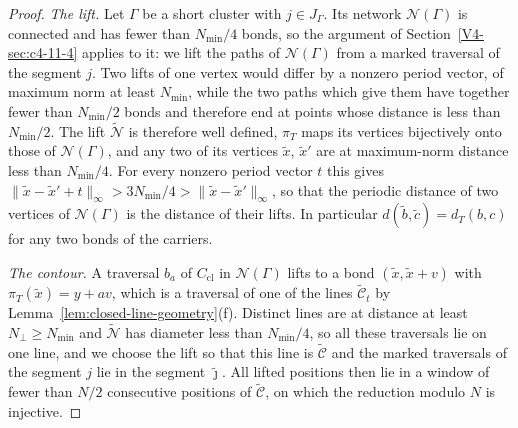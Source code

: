\documentclass[11pt]{article}
\numberwithin{equation}{section}
\theoremstyle{remark}
\theoremstyle{plain}
\begin{document}
\begin{proof}
\emph{The lift.} Let $\Gamma$ be a short cluster with $j\in J_{\Gamma}$. Its network $\mathscr N(\Gamma)$ is connected and has fewer than $N_{\min}/4$ bonds, so the argument of Section~\ref{V4-sec:c4-11-4} applies to it: we lift the paths of $\mathscr N(\Gamma)$ from a marked traversal of the segment $j$. Two lifts of one vertex would differ by a nonzero period vector, of maximum norm at least $N_{\min}$, while the two paths which give them have together fewer than $N_{\min}/2$ bonds and therefore end at points whose distance is less than $N_{\min}/2$. The lift $\widetilde{\mathscr N}$ is therefore well defined, $\pi_T$ maps its vertices bijectively onto those of $\mathscr N(\Gamma)$, and any two of its vertices $\tilde x$, $\tilde x'$ are at maximum-norm distance less than $N_{\min}/4$. For every nonzero period vector $t$ this gives $\|\tilde x-\tilde x'+t\|_{\infty}>3N_{\min}/4>\|\tilde x-\tilde x'\|_{\infty}$, so that the periodic distance of two vertices of $\mathscr N(\Gamma)$ is the distance of their lifts. In particular $d(\tilde b,\tilde c)= d_T(b,c)$ for any two bonds of the carriers.

\emph{The contour.} A traversal $b_a$ of $C_{\mathrm{cl}}$ in $\mathscr N(\Gamma)$ lifts to a bond $(\tilde x,\tilde x+v)$ with $\pi_T(\tilde x)= y+av$, which is a traversal of one of the lines $\widetilde{\mathcal C}_t$ by Lemma~\ref{lem:closed-line-geometry}(f). Distinct lines are at distance at least $N_{\perp}\geqslant N_{\min}$ and $\widetilde{\mathscr N}$ has diameter less than $N_{\min}/4$, so all these traversals lie on one line, and we choose the lift so that this line is $\widetilde{\mathcal C}$ and the marked traversals of the segment $j$ lie in the segment $\tilde\jmath$. All lifted positions then lie in a window of fewer than $N/2$ consecutive positions of $\widetilde{\mathcal C}$, on which the reduction modulo $N$ is injective.


\end{proof}
\end{document}
